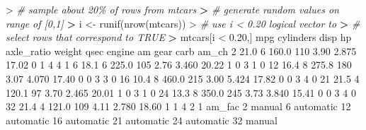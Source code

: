 \documentclass[
]{book}
\newenvironment{Shaded}{\begin{snugshade}}{\end{snugshade}}
\newcommand{\CommentTok}[1]{\textcolor[rgb]{0.56,0.35,0.01}{\textit{#1}}}
\newcommand{\DecValTok}[1]{\textcolor[rgb]{0.00,0.00,0.81}{#1}}
\newcommand{\ErrorTok}[1]{\textcolor[rgb]{0.64,0.00,0.00}{\textbf{#1}}}
\newcommand{\FloatTok}[1]{\textcolor[rgb]{0.00,0.00,0.81}{#1}}
\newcommand{\FunctionTok}[1]{\textcolor[rgb]{0.00,0.00,0.00}{#1}}
\newcommand{\NormalTok}[1]{#1}
\newcommand{\OtherTok}[1]{\textcolor[rgb]{0.56,0.35,0.01}{#1}}
\newcommand{\SpecialCharTok}[1]{\textcolor[rgb]{0.00,0.00,0.00}{#1}}
\begin{document}
\begin{Shaded}
\begin{Highlighting}[]
\SpecialCharTok{\textgreater{}} \CommentTok{\# sample about 20\% of rows from mtcars}
\ErrorTok{\textgreater{}} \CommentTok{\# generate random values on range of [0,1]}
\ErrorTok{\textgreater{}}\NormalTok{ i }\OtherTok{\textless{}{-}} \FunctionTok{runif}\NormalTok{(}\FunctionTok{nrow}\NormalTok{(mtcars))}
\SpecialCharTok{\textgreater{}} \CommentTok{\# use i \textless{} 0.20 logical vector to }
\ErrorTok{\textgreater{}} \CommentTok{\# select rows that correspond to TRUE}
\ErrorTok{\textgreater{}}\NormalTok{ mtcars[i }\SpecialCharTok{\textless{}} \FloatTok{0.20}\NormalTok{,]}
\NormalTok{    mpg cylinders  disp  hp axle\_ratio weight  qsec engine am gear carb am\_ch}
\DecValTok{2}  \FloatTok{21.0}         \DecValTok{6} \FloatTok{160.0} \DecValTok{110}       \FloatTok{3.90}  \FloatTok{2.875} \FloatTok{17.02}      \DecValTok{0}  \DecValTok{1}    \DecValTok{4}    \DecValTok{4}     \DecValTok{1}
\DecValTok{6}  \FloatTok{18.1}         \DecValTok{6} \FloatTok{225.0} \DecValTok{105}       \FloatTok{2.76}  \FloatTok{3.460} \FloatTok{20.22}      \DecValTok{1}  \DecValTok{0}    \DecValTok{3}    \DecValTok{1}     \DecValTok{0}
\DecValTok{12} \FloatTok{16.4}         \DecValTok{8} \FloatTok{275.8} \DecValTok{180}       \FloatTok{3.07}  \FloatTok{4.070} \FloatTok{17.40}      \DecValTok{0}  \DecValTok{0}    \DecValTok{3}    \DecValTok{3}     \DecValTok{0}
\DecValTok{16} \FloatTok{10.4}         \DecValTok{8} \FloatTok{460.0} \DecValTok{215}       \FloatTok{3.00}  \FloatTok{5.424} \FloatTok{17.82}      \DecValTok{0}  \DecValTok{0}    \DecValTok{3}    \DecValTok{4}     \DecValTok{0}
\DecValTok{21} \FloatTok{21.5}         \DecValTok{4} \FloatTok{120.1}  \DecValTok{97}       \FloatTok{3.70}  \FloatTok{2.465} \FloatTok{20.01}      \DecValTok{1}  \DecValTok{0}    \DecValTok{3}    \DecValTok{1}     \DecValTok{0}
\DecValTok{24} \FloatTok{13.3}         \DecValTok{8} \FloatTok{350.0} \DecValTok{245}       \FloatTok{3.73}  \FloatTok{3.840} \FloatTok{15.41}      \DecValTok{0}  \DecValTok{0}    \DecValTok{3}    \DecValTok{4}     \DecValTok{0}
\DecValTok{32} \FloatTok{21.4}         \DecValTok{4} \FloatTok{121.0} \DecValTok{109}       \FloatTok{4.11}  \FloatTok{2.780} \FloatTok{18.60}      \DecValTok{1}  \DecValTok{1}    \DecValTok{4}    \DecValTok{2}     \DecValTok{1}
\NormalTok{      am\_fac}
\DecValTok{2}\NormalTok{     manual}
\DecValTok{6}\NormalTok{  automatic}
\DecValTok{12}\NormalTok{ automatic}
\DecValTok{16}\NormalTok{ automatic}
\DecValTok{21}\NormalTok{ automatic}
\DecValTok{24}\NormalTok{ automatic}
\DecValTok{32}\NormalTok{    manual}
\end{Highlighting}
\end{Shaded}
\end{document}
